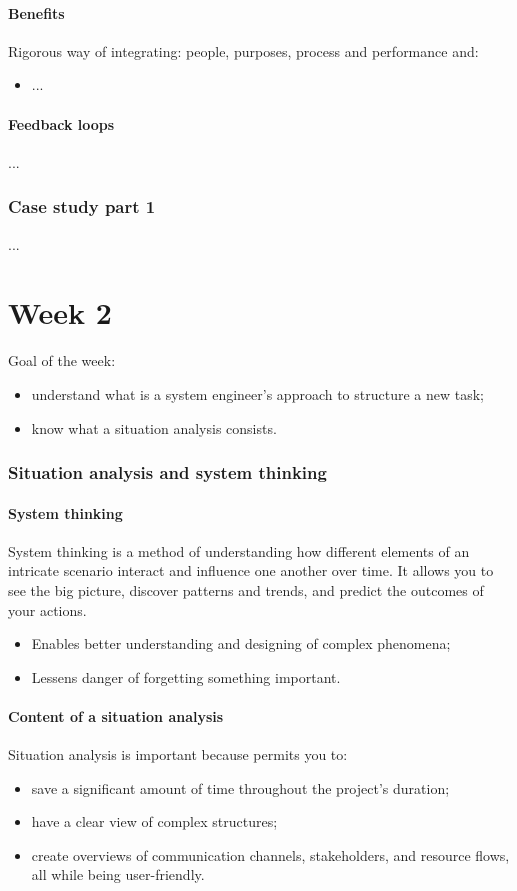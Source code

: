 \documentclass{article}
\begin{document}
\subsection{Benefits}
Rigorous way of integrating: people, purposes, process and performance and:
\begin{itemize}
    \item ...
\end{itemize}

\subsection{Feedback loops}
...

\section{Case study part 1}
...

\newpage
\part{Week 2}
Goal of the week:
\begin{itemize}
    \item understand what is a system engineer's approach to structure a new task;
    \item know what a situation analysis consists.
\end{itemize}
\section{Situation analysis and system thinking}
\subsection{System thinking}
System thinking is a method of understanding how different elements of an
intricate scenario interact and influence one another over time.
It allows you to see the big picture, discover patterns and trends, and predict
the outcomes of your actions.
\begin{itemize}
    \item Enables better understanding and designing of complex phenomena;
    \item Lessens danger of forgetting something important.
\end{itemize}

\subsection{Content of a situation analysis}
Situation analysis is important because permits you to:
\begin{itemize}
    \item save a significant amount of time throughout the project's duration;
    \item have a clear view of complex structures;
    \item create overviews of communication channels, stakeholders, and resource flows, all while being user-friendly.
\end{itemize}
\end{document}
